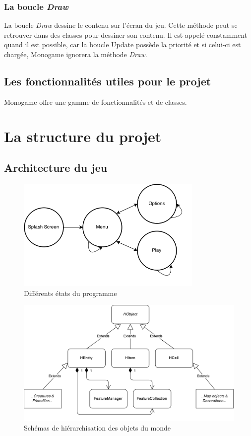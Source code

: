 \documentclass[11pt, a4paper, oneside]{report}
\begin{document}
\subsubsection{La boucle \textit{Draw}}
La boucle \textit{Draw} dessine le contenu sur l'écran du jeu. Cette méthode peut se retrouver dans des classes pour dessiner son contenu. Il est appelé constamment quand il est possible, car la boucle Update possède la priorité et si celui-ci est chargée, Monogame ignorera la méthode \textit{Draw}.
\subsection{Les fonctionnalités utiles pour le projet}
Monogame offre une gamme de fonctionnalités et de classes. 

\section{La structure du projet}
\subsection{Architecture du jeu}
\begin{figure}[H]
	\begin{center}
	\includegraphics[width=0.8\textwidth]{StatesOfProgram}
	\caption{Différents états du programme}
	\label{fig:StatesOfProgram}
	\end{center}
\end{figure}
\begin{figure}[H]
	\begin{center}
	\includegraphics[width=1\textwidth]{WorldObjects}
	\caption{Schémas de hiérarchisation des objets du monde}
	\label{fig:WorldObjects}
	\end{center}
\end{figure}
\end{document}
